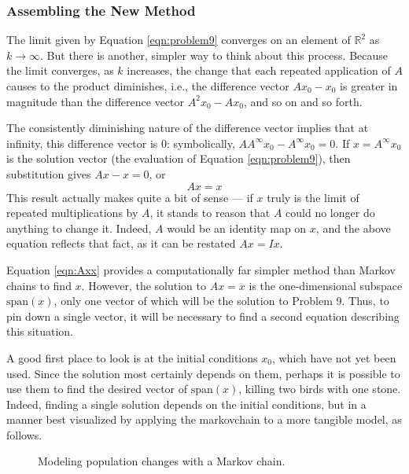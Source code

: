 \documentclass[titlepage]{article}
\newcommand{\spn}[1]{\text{span}\left( #1 \right)}
\begin{document}
\subsubsection{Assembling the New Method}\label{ss2:assemble}
The limit given by Equation \ref{eqn:problem9} converges on an element of $\mathbb{R}^2$ as $k\to\infty$. But there is another, simpler way to think about this process. Because the limit converges, as $k$ increases, the change that each repeated application of $A$ causes to the product diminishes, i.e., the difference vector $Ax_0-x_0$ is greater in magnitude than the difference vector $A^2x_0-Ax_0$, and so on and so forth.\par
The consistently diminishing nature of the difference vector implies that at infinity, this difference vector is 0: symbolically, $AA^\infty x_0-A^\infty x_0=0$. If $x=A^\infty x_0$ is the solution vector (the evaluation of Equation \ref{eqn:problem9}), then substitution gives $Ax-x=0$, or
\begin{equation}\label{eqn:Axx}
    Ax = x
\end{equation}
This result actually makes quite a bit of sense --- if $x$ truly is the limit of repeated multiplications by $A$, it stands to reason that $A$ could no longer do anything to change it. Indeed, $A$ would be an identity map on $x$, and the above equation reflects that fact, as it can be restated $Ax=Ix$.\par
Equation \ref{eqn:Axx} provides a computationally far simpler method than Markov chains to find $x$. However, the solution to $Ax=x$ is the one-dimensional subspace $\spn{x}$, only one vector of which will be the solution to Problem 9. Thus, to pin down a single vector, it will be necessary to find a second equation describing this situation.\par
A good first place to look is at the initial conditions $x_0$, which have not yet been used. Since the solution most certainly depends on them, perhaps it is possible to use them to find the desired vector of $\spn{x}$, killing two birds with one stone. Indeed, finding a single solution depends on the initial conditions, but in a manner best visualized by applying the \Gls{markovchain} to a more tangible model, as follows.

\begin{figure}[h!]
    \centering
    \caption{Modeling population changes with a Markov chain.}
    \label{fig:population}
\end{figure}
\end{document}
